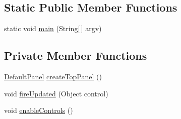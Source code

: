 \subsection*{Static Public Member Functions}
\begin{DoxyCompactItemize}
\item 
static void \mbox{\hyperlink{classorg_1_1newdawn_1_1slick_1_1tools_1_1peditor_1_1_graph_editor_window_a23eceece59208a68fdfe2b6bd742b716}{main}} (String\mbox{[}$\,$\mbox{]} argv)
\end{DoxyCompactItemize}
\subsection*{Private Member Functions}
\begin{DoxyCompactItemize}
\item 
\mbox{\hyperlink{classorg_1_1newdawn_1_1slick_1_1tools_1_1peditor_1_1_default_panel}{Default\+Panel}} \mbox{\hyperlink{classorg_1_1newdawn_1_1slick_1_1tools_1_1peditor_1_1_graph_editor_window_a17bf7e6c7e9015697f0c311357014b03}{create\+Top\+Panel}} ()
\item 
void \mbox{\hyperlink{classorg_1_1newdawn_1_1slick_1_1tools_1_1peditor_1_1_graph_editor_window_a2e90faf9e804d890ac95835230002850}{fire\+Updated}} (Object control)
\item 
void \mbox{\hyperlink{classorg_1_1newdawn_1_1slick_1_1tools_1_1peditor_1_1_graph_editor_window_a202a76d9a06ddca4e7c11686f1bfcee6}{enable\+Controls}} ()
\end{DoxyCompactItemize}
